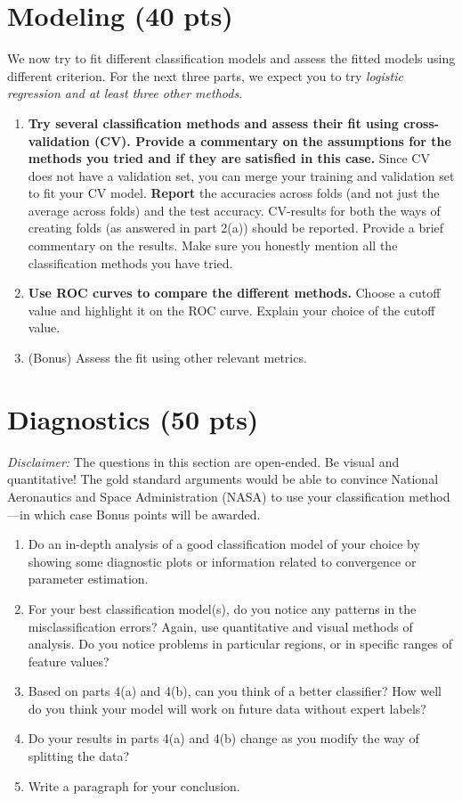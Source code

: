 \documentclass[11pt]{article}\usepackage[]{graphicx}\usepackage[]{color}
\begin{document}
\section{Modeling (40 pts)}
We now try to fit different classification models and assess the fitted
models using different criterion. For the next three parts, we expect you
to try \emph{logistic regression and at least three other methods}.
\begin{enumerate}[label=(\alph*)]
\item \textbf{Try several classification methods and assess their fit using
cross-validation (CV). Provide a commentary on the assumptions for the
methods you tried and if they are satisfied in this case.} 
Since CV does not have a validation set, you can merge your training and
validation set to fit your CV model. 
\textbf{Report} the accuracies across
folds (and not just the average across folds) and the test accuracy. CV-results
for both the ways of creating folds (as answered in part 2(a)) should be
reported. Provide a brief commentary on the results. Make sure you honestly
mention all the classification methods you have  tried.
\item \textbf{Use ROC curves to compare the different methods.} 
Choose a cutoff value and highlight it on the ROC curve. Explain your choice
of the cutoff value. 
\item (Bonus) Assess the fit using other relevant metrics.
\end{enumerate}

\section{Diagnostics (50 pts)}
\emph{Disclaimer:} The questions in this section are open-ended.
Be visual and quantitative! The gold standard arguments would be able to
convince National Aeronautics and  Space Administration (NASA) to use your
classification method---in which case Bonus points will be awarded.
\begin{enumerate}[label=(\alph*)]
\item Do an in-depth analysis of a good classification model
of your choice by showing some diagnostic plots or information related to
convergence or parameter estimation.
\item For your best classification model(s), do you notice any patterns in the 
misclassification errors? Again, use quantitative and visual methods of analysis. Do you notice problems in particular regions, or in
specific ranges of feature values?
\item Based on parts 4(a) and 4(b), can you think of a better classifier?
How well do you think your model will work on future data without expert 
labels?
\item Do your results in parts 4(a) and 4(b) change as you modify the
way of splitting the data?
\item Write a paragraph for your conclusion.
\end{enumerate}
\end{document}
